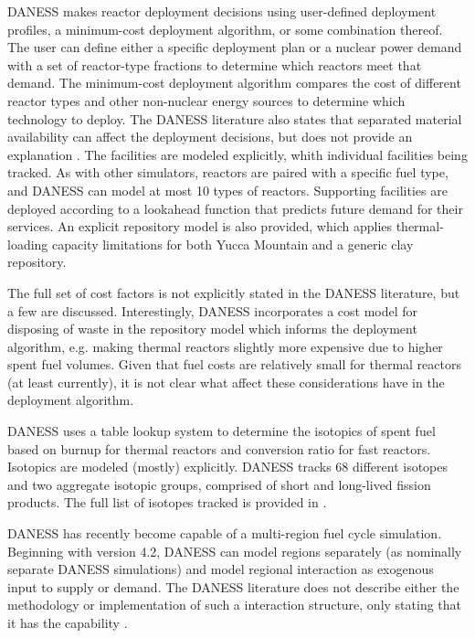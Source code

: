 DANESS makes reactor deployment decisions using user-defined deployment
profiles, a minimum-cost deployment algorithm, or some combination thereof. The
user can define either a specific deployment plan or a nuclear power demand with
a set of reactor-type fractions to determine which reactors meet that
demand. The minimum-cost deployment algorithm compares the cost of different
reactor types and other non-nuclear energy sources to determine which technology
to deploy. The DANESS literature also states that separated material
availability can affect the deployment decisions, but does not provide an
explanation \cite{van_den_durpel_daness_2009}. The facilities are modeled
explicitly, whith individual facilities being tracked. As with other simulators,
reactors are paired with a specific fuel type, and DANESS can model at most 10
types of reactors. Supporting facilities are deployed according to a lookahead
function that predicts future demand for their services. An explicit repository
model is also provided, which applies thermal-loading capacity limitations for
both Yucca Mountain and a generic clay repository. 

The full set of cost factors is not explicitly stated in the DANESS literature,
but a few are discussed. Interestingly, DANESS incorporates a cost model for
disposing of waste in the repository model which informs the deployment
algorithm, e.g. making thermal reactors slightly more expensive due to higher
spent fuel volumes. Given that fuel costs are relatively small for thermal
reactors (at least currently), it is not clear what affect these considerations
have in the deployment algorithm.

DANESS uses a table lookup system to determine the isotopics of spent fuel based
on burnup for thermal reactors and conversion ratio for fast reactors. Isotopics
are modeled (mostly) explicitly. DANESS tracks 68 different isotopes and two
aggregate isotopic groups, comprised of short and long-lived fission
products. The full list of isotopes tracked is provided
in \cite{van_den_durpel_daness_2009}.

DANESS has recently become capable of a multi-region fuel cycle simulation.
Beginning with version 4.2, DANESS can model regions separately (as nominally
separate DANESS simulations) and model regional interaction as exogenous input
to supply or demand. The DANESS literature does not describe either the
methodology or implementation of such a interaction structure, only stating that
it has the capability \cite{van_den_durpel_daness_2009}.
